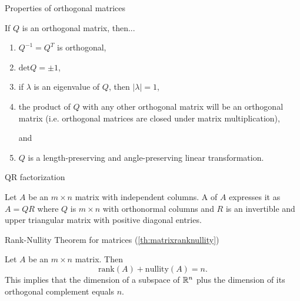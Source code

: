 \documentclass{ximera}
\begin{document}

Properties of orthogonal matrices
\begin{expandable}
If $Q$ is an orthogonal matrix, then...
\begin{enumerate}
    \item $Q^{-1} = Q^T$ is orthogonal,

    \item $\mbox{det} Q = \pm 1$,

    \item if $\lambda$ is an eigenvalue of $Q$, then $|\lambda|=1$,

    \item the product of $Q$ with any other orthogonal matrix will be an orthogonal matrix (i.e. orthogonal matrices are closed under matrix multiplication), 

    and

    \item $Q$ is a length-preserving and angle-preserving linear transformation.

\end{enumerate}
\end{expandable}


QR factorization
\begin{expandable}
    Let $A$ be an $m \times n$ matrix with independent columns. A  of $A$ expresses it as $A = QR$ where $Q$ is $m \times n$ with orthonormal columns and $R$ is an invertible and upper triangular matrix with positive diagonal entries.
\end{expandable}


Rank-Nullity Theorem for matrices (\ref{th:matrixranknullity})
\begin{expandable}
    Let $A$ be an $m\times n$ matrix.  Then 
$$\mbox{rank}(A)+\mbox{nullity}(A)=n.$$
This implies that the dimension of a subspace of $\mathbb{R}^n$ plus the dimension of its orthogonal complement equals $n$.
\end{expandable}
\end{document}
